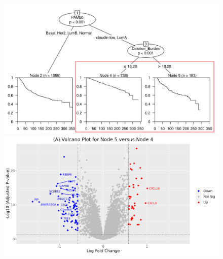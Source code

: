 \vfill
\begin{figure}[H]
\begin{center}
\begin{multicols}{2}
	\includegraphics[width=1\linewidth]{../figures/Chapter_4/Ctree_Survival_Burden_DSS_PAM50_Ann.png}\par 
    \includegraphics[width=1\linewidth]{../figures/Chapter_4/Volcano_1.png}\par 
    

\end{multicols}
\end{center}
\end{figure}
